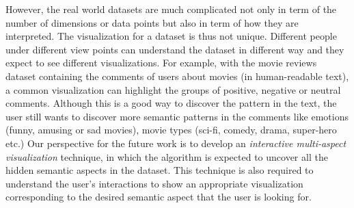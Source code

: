 However, the real world datasets are much complicated not only in term of the number of dimensions or data points but also in term of how they are interpreted.
The visualization for a dataset is thus not unique. Different people under different view points can understand the dataset in different way and they expect to see different visualizations.
For example, with the movie reviews dataset containing the comments of users about movies (in human-readable text), a common visualization can highlight the groups of positive, negative or neutral comments.
Although this is a good way to discover the pattern in the text, the user still wants to discover more semantic patterns in the comments like emotions (funny, amusing or sad movies), movie types (sci-fi, comedy, drama, super-hero etc.)
Our perspective for the future work is to develop an \emph{interactive multi-aspect visualization} technique, in which the algorithm is expected to uncover all the hidden semantic aspects in the dataset.
This technique is also required to understand the user's interactions to show an appropriate visualization corresponding to the desired semantic aspect that the user is looking for.